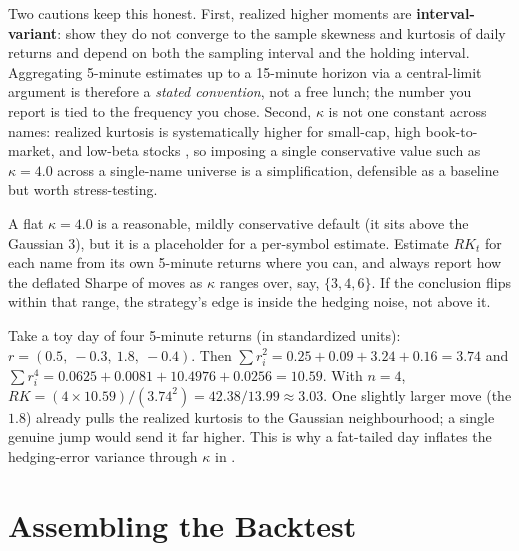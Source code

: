 Two cautions keep this honest. First, realized higher moments are \textbf{interval-variant}: \citet{AhadzieJeyasreedharan2020} show they do not converge to the sample skewness and kurtosis of daily returns and depend on both the sampling interval and the holding interval. Aggregating 5-minute estimates up to a 15-minute horizon via a central-limit argument is therefore a \emph{stated convention}, not a free lunch; the number you report is tied to the frequency you chose. Second, $\kappa$ is not one constant across names: realized kurtosis is systematically higher for small-cap, high book-to-market, and low-beta stocks \citep{AmayaEtAl2015}, so imposing a single conservative value such as $\kappa = 4.0$ across a single-name universe is a simplification, defensible as a baseline but worth stress-testing.

\begin{warning}[$\kappa = 4.0$ Is a Convention, Not a Measurement]
A flat $\kappa = 4.0$ is a reasonable, mildly conservative default (it sits above the Gaussian $3$), but it is a placeholder for a per-symbol estimate. Estimate $RK_t$ for each name from its own 5-minute returns where you can, and always report how the deflated Sharpe of  moves as $\kappa$ ranges over, say, $\{3, 4, 6\}$. If the conclusion flips within that range, the strategy's edge is inside the hedging noise, not above it.
\end{warning}

\begin{workedexample}
Take a toy day of four 5-minute returns (in standardized units): $r = (0.5,\ -0.3,\ 1.8,\ -0.4)$. Then $\sum r_i^2 = 0.25 + 0.09 + 3.24 + 0.16 = 3.74$ and $\sum r_i^4 = 0.0625 + 0.0081 + 10.4976 + 0.0256 = 10.59$. With $n=4$, $RK = (4 \times 10.59)/(3.74^2) = 42.38/13.99 \approx 3.03$. One slightly larger move (the $1.8$) already pulls the realized kurtosis to the Gaussian neighbourhood; a single genuine jump would send it far higher. This is why a fat-tailed day inflates the hedging-error variance through $\kappa$ in .
\end{workedexample}

\section{Assembling the Backtest}
\label{sec:ivrv:algorithm}

